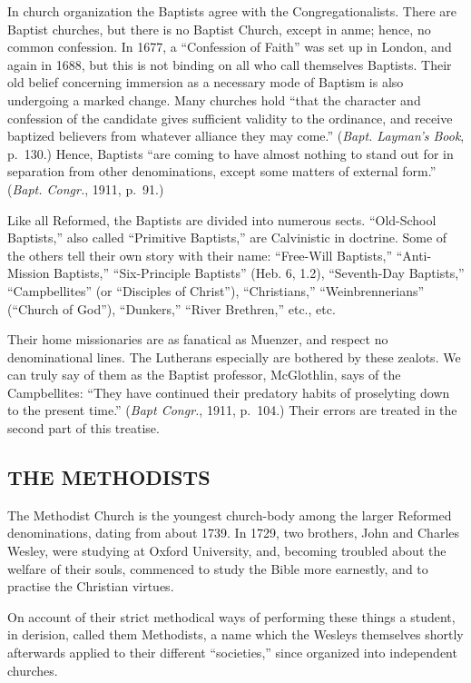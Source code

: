 \documentclass[
]{book}
\begin{document}
In church organization the Baptists agree with the Congregationalists. There are Baptist churches, but there is no Baptist Church, except in anme; hence, no common confession. In 1677, a ``Confession of Faith'' was set up in London, and again in 1688, but this is not binding on all who call themselves Baptists. Their old belief concerning immersion as a necessary mode of Baptism is also undergoing a marked change. Many churches hold ``that the character and confession of the candidate gives sufficient validity to the ordinance, and receive baptized believers from whatever alliance they may come.'' (\emph{Bapt. Layman's Book}, p.~130.) Hence, Baptists ``are coming to have almost nothing to stand out for in separation from other denominations, except some matters of external form.'' (\emph{Bapt. Congr.}, 1911, p.~91.)

Like all Reformed, the Baptists are divided into numerous sects. ``Old-School Baptists,'' also called ``Primitive Baptists,'' are Calvinistic in doctrine. Some of the others tell their own story with their name: ``Free-Will Baptists,'' ``Anti-Mission Baptists,'' ``Six-Principle Baptists'' (Heb. 6, 1.2), ``Seventh-Day Baptists,'' ``Campbellites'' (or ``Disciples of Christ''), ``Christians,'' ``Weinbrennerians'' (``Church of God''), ``Dunkers,'' ``River Brethren,'' etc., etc.

Their home missionaries are as fanatical as Muenzer, and respect no denominational lines. The Lutherans especially are bothered by these zealots. We can truly say of them as the Baptist professor, McGlothlin, says of the Campbellites: ``They have continued their predatory habits of proselyting down to the present time.'' (\emph{Bapt Congr.}, 1911, p.~104.) Their errors are treated in the second part of this treatise.

\subsection{THE METHODISTS}\label{the-methodists}

The Methodist Church is the youngest church-body among the larger Reformed denominations, dating from about 1739. In 1729, two brothers, John and Charles Wesley, were studying at Oxford University, and, becoming troubled about the welfare of their souls, commenced to study the Bible more earnestly, and to practise the Christian virtues.

On account of their strict methodical ways of performing these things a student, in derision, called them Methodists, a name which the Wesleys themselves shortly afterwards applied to their different ``societies,'' since organized into independent churches.
\end{document}
